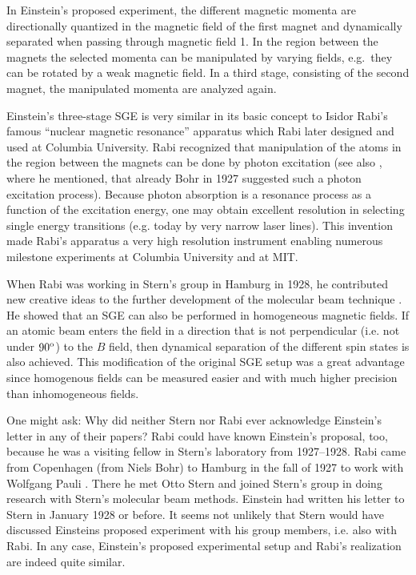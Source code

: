 \documentclass{article}
\begin{document}
In Einstein's proposed experiment, the different magnetic momenta are directionally quantized in the magnetic field of the first magnet and dynamically separated when passing through magnetic field 1. In the region between the magnets the selected momenta can be manipulated by varying fields, e.g.\ they can be rotated by a weak magnetic field. In a third stage, consisting of the second magnet, the manipulated momenta are analyzed again. 

Einstein's three-stage SGE is very similar in its basic concept to Isidor Rabi's famous ``nuclear magnetic resonance'' apparatus \citep{RabiIEtal1934Moment,RabiIEtal1939Method,KelloggMEtal1939Moments} which Rabi later designed and used at Columbia University. Rabi recognized that manipulation of the atoms in the region between the magnets can be done by photon excitation (see also \cite[pp.~191--192]{HeisenbergW1927Inhalt}, where he mentioned, that already Bohr in 1927 suggested such a photon excitation process). Because photon absorption is a resonance process as a function of the excitation energy, one may obtain excellent resolution in selecting single energy transitions (e.g. today by very narrow laser lines). This invention made Rabi's apparatus a very high resolution instrument enabling numerous milestone experiments at Columbia University and at MIT. 

When Rabi was working in Stern's group in Hamburg in 1928, he contributed new creative ideas to the further development of the molecular beam technique \citep{RabiI1929Methode}. He showed that an SGE can also be performed in homogeneous magnetic fields. If an atomic beam enters the field in a direction that is not perpendicular (i.e. not under $90^{\rm o}$) to the $B$ field, then dynamical separation of the different spin states is also achieved. This modification of the original SGE setup was a great advantage since homogenous fields can be measured easier and with much higher precision than inhomogeneous fields. 

One might ask: Why did neither Stern nor Rabi ever acknowledge Einstein's letter in any of their papers? Rabi could have known Einstein's proposal, too, because he was a visiting fellow in Stern's laboratory from 1927--1928. Rabi came from Copenhagen (from Niels Bohr) to Hamburg in the fall of 1927 to work with Wolfgang Pauli \citep{SchmidtBoeckingHEtal2011Stern,ToenniesJEtal2011Stern}. There he met Otto Stern and joined Stern's group in doing research with Stern's molecular beam methods. Einstein had written his letter to Stern in January 1928 or before. It seems not unlikely that Stern would have discussed Einsteins proposed experiment with his group members, i.e. also with Rabi. In any case,
Einstein's proposed experimental setup and Rabi's realization are indeed quite similar. 
\end{document}
